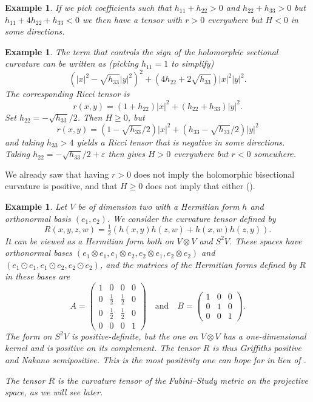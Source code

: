 \documentclass[10pt,a4paper]{article}
\newtheorem{exam}[theo]{Example}
\def\qandq{\quad\text{and}\quad}
\begin{document}
\begin{exam}
If we pick coefficients such that $h_{11} + h_{22} > 0$ and $h_{22} + h_{33} > 0$ but $h_{11} + 4h_{22} + h_{33} < 0$ we then have a tensor with $r > 0$ everywhere but $H < 0$ in some directions.
\end{exam}

\begin{exam}
The term that controls the sign of the holomorphic sectional curvature can be written as (picking $h_{11} = 1$ to simplify)
$$
(|x|^2 - \sqrt{h_{33}}|y|^2)^2 + (4h_{22} + 2\sqrt{h_{33}})|x|^2|y|^2.
$$
The corresponding Ricci tensor is
$$
r(x,y) = (1 + h_{22})|x|^2 + (h_{22} + h_{33}) |y|^2.
$$
Set $h_{22} = -\sqrt{h_{33}}/2$. Then $H \geq 0$, but
$$
r(x,y) = (1-\sqrt{h_{33}}/2)|x|^2 + (h_{33} - \sqrt{h_{33}}/2)|y|^2
$$
and taking $h_{33} > 4$ yields a Ricci tensor that is negative in some directions. Taking $h_{22} = -\sqrt{h_{33}}/2 + \varepsilon$ then gives $H > 0$ everywhere but $r < 0$ somewhere.
\end{exam}

We already saw that having $r > 0$ does not imply the holomorphic bisectional curvature is positive, and that $H \geq 0$ does not imply that either ().


\begin{exam}
Let $V$ be of dimension two with a Hermitian form $h$ and orthonormal basis $(e_1,e_2)$. We consider the curvature tensor defined by
$$
R(x,y,z,w) = \tfrac12( h(x,y)h(z,w) + h(x,w)h(z,y)).
$$
It can be viewed as a Hermitian form both on $V \otimes V$ and $S^2V$. These spaces have orthonormal bases $(e_1 \otimes e_1, e_1 \otimes e_2, e_2 \otimes e_1, e_2 \otimes e_2)$ and $(e_1 \odot e_1, e_1 \odot e_2, e_2 \odot e_2)$, and the matrices of the Hermitian forms defined by $R$ in these bases are
$$
A = \begin{pmatrix}
  1 & 0 & 0 & 0 \\
  0 & \tfrac12 & \tfrac12 & 0 \\
  0 & \tfrac12 & \tfrac12 & 0 \\
  0 & 0 & 0 & 1
\end{pmatrix}
\qandq
B = \begin{pmatrix}
  1 & 0 & 0 \\
  0 & 1 & 0 \\
  0 & 0 & 1
\end{pmatrix}.
$$
The form on $S^2V$ is positive-definite, but the one on $V \otimes V$ has a one-dimensional kernel and is positive on its complement. The tensor $R$ is thus Griffiths positive and Nakano semipositive. This is the most positivity one can hope for in lieu of .

The tensor $R$ is the curvature tensor of the Fubini--Study metric on the projective space, as we will see later.
\end{exam}
\end{document}
